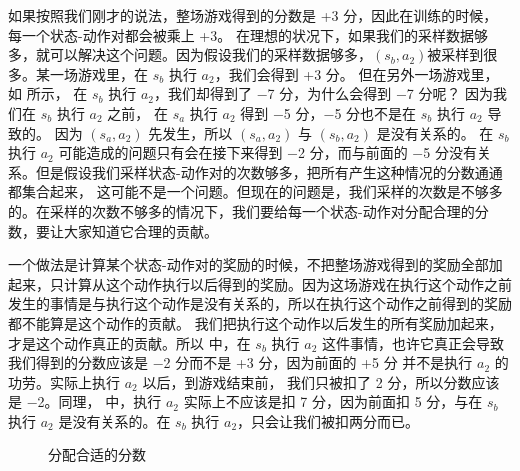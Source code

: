 如果按照我们刚才的说法，整场游戏得到的分数是 +3 分，因此在训练的时候， 每一个状态-动作对都会被乘上 +3。 在理想的状况下，如果我们的采样数据够多，就可以解决这个问题。因为假设我们的采样数据够多，$(s_b,a_2)$被采样到很多。某一场游戏里，在 $s_b$ 执行 $a_2$，我们会得到 +3 分。 
但在另外一场游戏里，如 所示，
在 $s_b$ 执行 $a_2$，我们却得到了 $-$7 分，为什么会得到 $-$7 分呢？ 
因为我们在 $s_b$ 执行 $a_2$ 之前， 
在 $s_a$ 执行 $a_2$ 得到 $-$5 分，$-$5 分也不是在 $s_b$ 执行 $a_2$ 导致的。
因为 $(s_a,a_2)$ 先发生，所以 $(s_a,a_2)$ 与 $(s_b,a_2)$ 是没有关系的。
在 $s_b$ 执行 $a_2$ 可能造成的问题只有会在接下来得到 $-$2 分，而与前面的 $-$5 分没有关系。但是假设我们采样状态-动作对的次数够多，把所有产生这种情况的分数通通都集合起来， 这可能不是一个问题。但现在的问题是，我们采样的次数是不够多的。在采样的次数不够多的情况下，我们要给每一个状态-动作对分配合理的分数，要让大家知道它合理的贡献。

一个做法是计算某个状态-动作对的奖励的时候，不把整场游戏得到的奖励全部加起来，只计算从这个动作执行以后得到的奖励。因为这场游戏在执行这个动作之前发生的事情是与执行这个动作是没有关系的，所以在执行这个动作之前得到的奖励都不能算是这个动作的贡献。
我们把执行这个动作以后发生的所有奖励加起来，才是这个动作真正的贡献。所以 中，在 $s_b$ 执行 $a_2$ 这件事情，也许它真正会导致我们得到的分数应该是 $-$2 分而不是 +3 分，因为前面的 +5 分 并不是执行 $a_2$ 的功劳。实际上执行 $a_2$ 以后，到游戏结束前， 我们只被扣了 2 分，所以分数应该是 $-$2。同理， 中，执行 $a_2$ 实际上不应该是扣 7 分，因为前面扣 5 分，与在 $s_b$ 执行 $a_2$ 是没有关系的。在 $s_b$ 执行 $a_2$，只会让我们被扣两分而已。

\begin{figure}[hbt]
    \centering
    \caption{分配合适的分数}
    \label{fig:fig4.15}
\end{figure}

